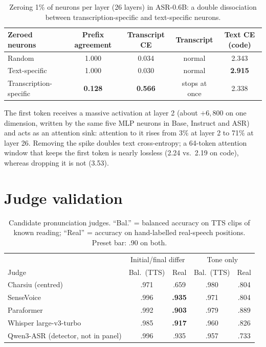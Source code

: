 \documentclass[11pt]{article}
\begin{document}
\begin{table}[h]
  \centering\small
  \caption{Zeroing 1\% of neurons per layer (26 layers) in ASR-0.6B: a double dissociation between transcription-specific and text-specific neurons.}
  \begin{tabular}{lcccc}
    \toprule
    Zeroed neurons & Prefix agreement & Transcript CE & Transcript & Text CE (code) \\
    \midrule
    Random & 1.000 & 0.034 & normal & 2.343 \\
    Text-specific & 1.000 & 0.030 & normal & \textbf{2.915} \\
    Transcription-specific & \textbf{0.128} & \textbf{0.566} & stops at once & 2.338 \\
    \bottomrule
  \end{tabular}
\end{table}

The first token receives a massive activation at layer 2 (about $+6{,}800$ on one dimension, written by the same five MLP neurons in Base, Instruct and ASR) and acts as an attention sink: attention to it rises from 3\% at layer 2 to 71\% at layer 26. Removing the spike doubles text cross-entropy; a 64-token attention window that keeps the first token is nearly lossless (2.24 vs.\ 2.19 on code), whereas dropping it is not (3.53).

\section{Judge validation}
\label{app:judges}

\begin{table}[h]
  \centering\small
  \caption{Candidate pronunciation judges. ``Bal.'' = balanced accuracy on TTS clips of known reading; ``Real'' = accuracy on hand-labelled real-speech positions. Preset bar: .90 on both.}
  \label{tab:judges}
  \begin{tabular}{lcccc}
    \toprule
    & \multicolumn{2}{c}{Initial/final differ} & \multicolumn{2}{c}{Tone only} \\
    Judge & Bal.\ (TTS) & Real & Bal.\ (TTS) & Real \\
    \midrule
    Charsiu (centred) & .971 & .659 & .980 & .804 \\
    SenseVoice & .996 & \textbf{.935} & .971 & .804 \\
    Paraformer & .992 & \textbf{.903} & .979 & .889 \\
    Whisper large-v3-turbo & .985 & \textbf{.917} & .960 & .826 \\
    Qwen3-ASR (detector, not in panel) & .996 & .935 & .957 & .733 \\
    \bottomrule
  \end{tabular}
\end{table}
\end{document}
